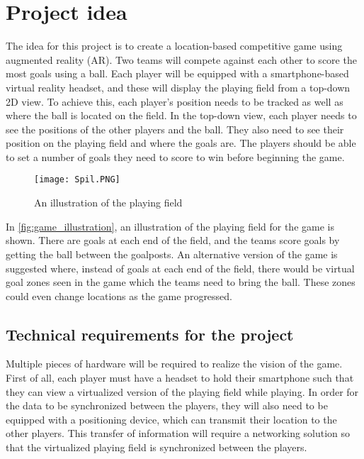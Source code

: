 \section{Project idea}\label{sec:projectidea}
The idea for this project is to create a location-based competitive game using augmented reality (AR).
Two teams will compete against each other to score the most goals using a ball. 
Each player will be equipped with a smartphone-based virtual reality headset, and these will display the playing field from a top-down 2D view. 
To achieve this, each player's position needs to be tracked as well as where the ball is located on the field.
In the top-down view, each player needs to see the positions of the other players and the ball.
They also need to see their position on the playing field and where the goals are.
The players should be able to set a number of goals they need to score to win before beginning the game. 
\begin{figure}[H]
    \centering
    \texttt{[image: Spil.PNG]}
    \caption{An illustration of the playing field}
    \label{fig:game_illustration}
\end{figure}
\noindent
In \autoref{fig:game_illustration}, an illustration of the playing field for the game is shown.
There are goals at each end of the field, and the teams score goals by getting the ball between the goalposts.
An alternative version of the game is suggested where, instead of goals at each end of the field, there would be virtual goal zones seen in the game which the teams need to bring the ball.
These zones could even change locations as the game progressed.

\subsection{Technical requirements for the project}
Multiple pieces of hardware will be required to realize the vision of the game.
First of all, each player must have a headset to hold their smartphone such that they can view a virtualized version of the playing field while playing.
In order for the data to be synchronized between the players, they will also need to be equipped with a positioning device, which can transmit their location to the other players.
This transfer of information will require a networking solution so that the virtualized playing field is synchronized between the players.

